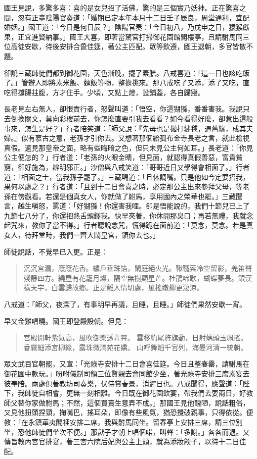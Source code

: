 國王見說，多驚多喜：喜的是女兒招了活佛，驚的是三個實乃妖神。正在驚喜之間，忽有正臺陰陽官奏道：「婚期已定本年本月十二日壬子辰良，周堂通利，宜配婚姻。」國王道：「今日是何日辰？」陰陽官奏：「今日初八，乃戊申之日，猿猴獻果，正宜進賢納事。」國王大喜，即著當駕官打掃御花園館閣樓亭，且請駙馬同三位高徒安歇，待後安排合巹佳筵，著公主匹配。眾等欽遵，國王退朝，多官皆散不題。

卻說三藏師徒們都到御花園，天色漸晚，擺了素膳。八戒喜道：「這一日也該吃飯了。」管辦人即將素米飯、麵飯等物，整擔挑來。那八戒吃了又添，添了又吃，直吃得撐腸拄腹，方才住手。少頃，又點上燈，設鋪蓋，各自歸寢。

長老見左右無人，卻恨責行者，怒聲叫道：「悟空，你這猢猻，番番害我。我說只去倒換關文，莫向彩樓前去，你怎麼直要引我去看看？如今看得好麼，卻惹出這般事來，怎生是好？」行者陪笑道：「師父說：『先母也是拋打繡毬，遇舊緣，成其夫婦。』似有慕古之意，老孫才引你去。又想著那個給孤布金寺長老之言，就此檢視真假。適見那皇帝之面，略有些晦暗之色，但只未見公主何如耳。」長老道：「你見公主便怎的？」行者道：「老孫的火眼金睛，但見面，就認得真假善惡，富貴貧窮，卻好施為，辨明邪正。」沙僧與八戒笑道：「哥哥近日又學得會相面了。」行者道：「相面之士，當我孫子罷了。」三藏喝道：「且休調嘴。只是他如今定要招我，果何以處之？」行者道：「且到十二日會喜之時，必定那公主出來參拜父母，等老孫在傍觀看。若還是個真女人，你就做了駙馬，享用國內之榮華也罷。」三藏聞言，越生嗔怒，罵道：「好猢猻！你還害我哩。卻是悟能說的，我們十節兒已上了九節七八分了，你還把熱舌頭鐸我。快早夾著，你休開那臭口；再若無禮，我就念起咒來，教你了當不得。」行者聽說念咒，慌得跪在面前道：「莫念，莫念。若是真女人，待拜堂時，我們一齊大鬧皇宮，領你去也。」

師徒說話，不覺早已入更。正是：
\begin{quote}
沉沉宮漏，廕廕花香。繡戶垂珠箔，閑庭絕火光。鞦韆索冷空留影，羌笛聲殘靜四方。繞屋有花籠月燦，隔空無樹顯星芒。杜鵑啼歇，蝴蝶夢長。銀漢橫天宇，白雲歸故鄉。正是離人情切處，風搖嫩柳更淒涼。
\end{quote}

八戒道：「師父，夜深了，有事明早再議，且睡，且睡。」師徒們果然安歇一宵。

早又金雞唱曉。國王即登殿設朝。但見：
\begin{quote}
宮殿開軒紫氣高，風吹御樂透青霄。
雲移豹尾旌旗動，日射螭頭玉珮搖。
香霧細添宮柳綠，露珠微潤苑花嬌。
山呼舞蹈千官列，海晏河清一統朝。
\end{quote}

眾文武百官朝罷，又宣：「光祿寺安排十二日會喜佳筵。今日且整春罍，請駙馬在御花園中款玩。」吩咐儀制司領三位賢親去會同館少坐，著光祿寺安排三席素宴去彼奉陪。兩處俱著教坊司奏樂，伏侍賞春景，消遲日也。八戒聞得，應聲道：「陛下，我師徒自相會，更無一刻相離。今日既在御花園飲宴，帶我們去耍兩日，好教師父替你家做駙馬；不然，這個買賣生意弄不成。」那國王見他醜陋，說話粗俗，又見他扭頭捏頸，掬嘴巴，搖耳朵，即像有些風氣，猶恐攪破親事，只得依從。便教：「在永鎮華夷閣裡安排二席，我與駙馬同坐。留春亭上安排三席，請三位別坐，恐他師徒們坐次不便。」那獃子才朝上唱個喏，叫聲：「多謝。」各各而退。又傳旨教內宮官排宴，著三宮六院后妃與公主上頭，就為添妝餪子，以待十二日佳配。

